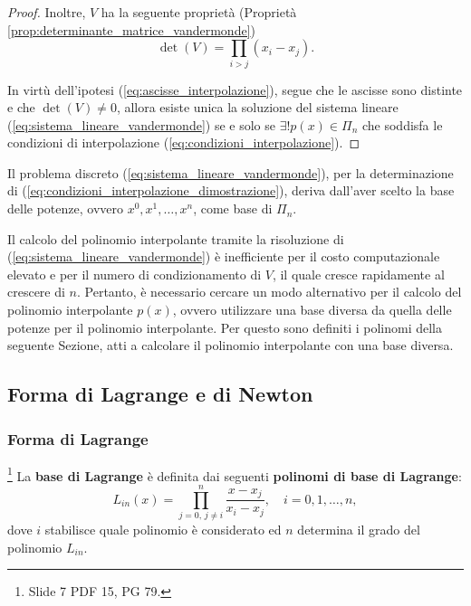 \begin{proof}
    Inoltre, $V$ ha la seguente proprietà (Proprietà \ref{prop:determinante_matrice_vandermonde})
    \begin{equation*}
    	\det(V)= \prod_{i>j}(x_i-x_j).
    \end{equation*}
    
    In virtù dell'ipotesi (\ref{eq:ascisse_interpolazione}), segue che le ascisse sono distinte e che $\det(V)\neq 0$, allora esiste unica la soluzione del sistema lineare (\ref{eq:sistema_lineare_vandermonde}) se e solo se $\exists! p(x)\in\Pi_n$ che soddisfa le condizioni di interpolazione (\ref{eq:condizioni_interpolazione}).
\end{proof}

Il problema discreto (\ref{eq:sistema_lineare_vandermonde}), per la determinazione di (\ref{eq:condizioni_interpolazione_dimostrazione}), deriva dall'aver scelto la base delle potenze, ovvero ${x^0,x^1,\hdots, x^n}$, come base di $\Pi_n$.

Il calcolo del polinomio interpolante tramite la risoluzione di (\ref{eq:sistema_lineare_vandermonde}) è inefficiente per il costo computazionale elevato e per il numero di condizionamento di $V$, il quale cresce rapidamente al crescere di $n$. Pertanto, è necessario cercare un modo alternativo per il calcolo del polinomio interpolante $p(x)$, ovvero utilizzare una base diversa da quella delle potenze per il polinomio interpolante. Per questo sono definiti i polinomi della seguente Sezione, atti a calcolare il polinomio interpolante con una base diversa.

\subsection{Forma di Lagrange e di Newton}

\subsubsection{Forma di Lagrange}

\begin{definition}\footnote{Slide 7 PDF 15, PG 79.}
    La \textbf{base di Lagrange} è definita dai seguenti \textbf{polinomi di base di Lagrange}:
    \begin{equation}\label{eq:polinomi_lagrange}
        L_{in}(x)=\prod_{j=0,\,j\neq i}^{n} \frac{x-x_j}{x_i-x_j},\quad i=0,1,\hdots,n, 
    \end{equation}
    dove $i$ stabilisce quale polinomio è considerato ed $n$ determina il grado del polinomio $L_{in}$.
\end{definition}

